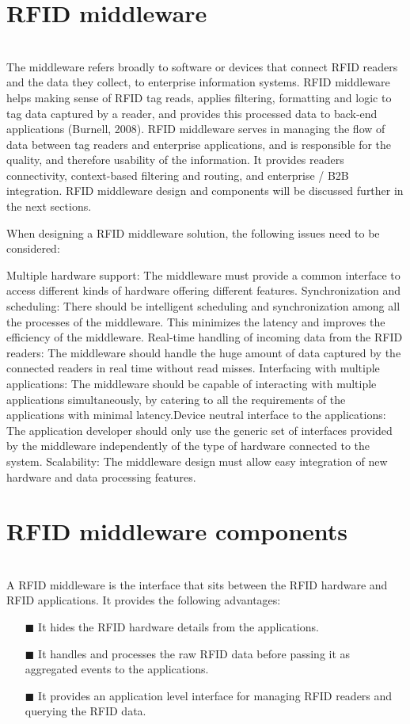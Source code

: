\documentclass[a4paper,12pt]{article}
\begin{document}
\begin{multicols}{2}
\section{RFID middleware}
\\
The middleware refers broadly to software or devices that connect RFID readers and the data they collect, to enterprise information systems. RFID middleware helps making sense of RFID tag reads, applies filtering, formatting and logic to tag data captured by a reader, and provides this processed data to back-end applications (Burnell, 2008). RFID middleware serves in managing the flow of data between tag readers and enterprise applications, and is responsible for the quality, and therefore usability of the information. It provides readers connectivity, context-based filtering and routing, and enterprise / B2B integration. RFID middleware design and components will be discussed further in the next sections.

When designing a RFID middleware solution, the following issues need to be considered:

Multiple hardware support: The middleware must provide a common interface to access different kinds of hardware offering different features. Synchronization and scheduling: There should be intelligent scheduling and synchronization among all the processes of the middleware. This minimizes the latency and improves the efficiency of the middleware. Real-time handling of incoming data from the RFID readers: The middleware should handle the huge amount of data captured by the connected readers in real time without read misses. Interfacing with multiple applications: The middleware should be capable of interacting with multiple applications simultaneously, by catering to all the requirements of the applications with minimal latency.Device neutral interface to the applications: The application developer should only use the generic set of interfaces provided by the middleware independently of the type of hardware connected to the system. Scalability: The middleware design must allow easy integration of new hardware and data processing features.

\section{RFID middleware components}
\\
A RFID middleware is the interface that sits between the RFID hardware and RFID applications. It provides the following advantages:
\begin{itemize}
\item[$\blacksquare$] It hides the RFID hardware details from the applications.
\item[$\blacksquare$] It handles and processes the raw RFID data before passing it as aggregated events to the applications.
\item[$\blacksquare$] It provides an application level interface for managing RFID readers and querying the RFID data.
\end{itemize}


\end{multicols}
\end{document}
